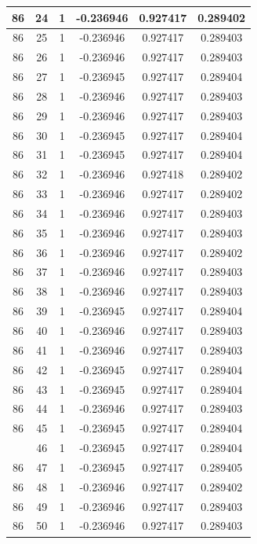 \documentclass[12pt,a4paper]{article}
\numberwithin{equation}{section}
\numberwithin{figure}{section}
\numberwithin{table}{section}
\begin{document}
\begin{longtable}{|c|c|c|c|c|c|}
86 & 24 & 1 & -0.236946 & 0.927417 & 0.289402 \\ \hline
86 & 25 & 1 & -0.236946 & 0.927417 & 0.289403 \\ \hline
86 & 26 & 1 & -0.236946 & 0.927417 & 0.289403 \\ \hline
86 & 27 & 1 & -0.236945 & 0.927417 & 0.289404 \\ \hline
86 & 28 & 1 & -0.236946 & 0.927417 & 0.289403 \\ \hline
86 & 29 & 1 & -0.236946 & 0.927417 & 0.289403 \\ \hline
86 & 30 & 1 & -0.236945 & 0.927417 & 0.289404 \\ \hline
86 & 31 & 1 & -0.236945 & 0.927417 & 0.289404 \\ \hline
86 & 32 & 1 & -0.236946 & 0.927418 & 0.289402 \\ \hline
86 & 33 & 1 & -0.236946 & 0.927417 & 0.289402 \\ \hline
86 & 34 & 1 & -0.236946 & 0.927417 & 0.289403 \\ \hline
86 & 35 & 1 & -0.236946 & 0.927417 & 0.289403 \\ \hline
86 & 36 & 1 & -0.236946 & 0.927417 & 0.289402 \\ \hline
86 & 37 & 1 & -0.236946 & 0.927417 & 0.289403 \\ \hline
86 & 38 & 1 & -0.236946 & 0.927417 & 0.289403 \\ \hline
86 & 39 & 1 & -0.236945 & 0.927417 & 0.289404 \\ \hline
86 & 40 & 1 & -0.236946 & 0.927417 & 0.289403 \\ \hline
86 & 41 & 1 & -0.236946 & 0.927417 & 0.289403 \\ \hline
86 & 42 & 1 & -0.236945 & 0.927417 & 0.289404 \\ \hline
86 & 43 & 1 & -0.236945 & 0.927417 & 0.289404 \\ \hline
86 & 44 & 1 & -0.236946 & 0.927417 & 0.289403 \\ \hline
86 & 45 & 1 & -0.236945 & 0.927417 & 0.289404 \\ \hline
\pagebreak
86 & 46 & 1 & -0.236945 & 0.927417 & 0.289404 \\ \hline
86 & 47 & 1 & -0.236945 & 0.927417 & 0.289405 \\ \hline
86 & 48 & 1 & -0.236946 & 0.927417 & 0.289402 \\ \hline
86 & 49 & 1 & -0.236946 & 0.927417 & 0.289403 \\ \hline
86 & 50 & 1 & -0.236946 & 0.927417 & 0.289403 \\ \hline

\end{longtable}
\end{document}
